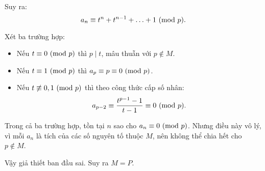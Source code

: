 \documentclass[../09-contruction-methods.tex]{subfiles}
\begin{document}
\begin{soln}
    Suy ra:
    \[
    	a_n \equiv t^n + t^{n-1} + \ldots + 1 \ (\mathrm{mod}\ p).
    \]
    
    Xét ba trường hợp:
    \begin{itemize}[topsep=0pt, partopsep=0pt, itemsep=0pt]
        \item Nếu \( t \equiv 0 \ (\mathrm{mod}\ p) \) thì \( p \mid t \), mâu thuẫn với \( p \notin M \).
        \item Nếu \( t \equiv 1 \ (\mathrm{mod}\ p) \) thì \( a_p \equiv p \equiv 0 \ (\mathrm{mod}\ p) \).
        \item Nếu \( t \not\equiv 0,1 \ (\mathrm{mod}\ p) \) thì theo công thức cấp số nhân:
        \[
        	a_{p-2} \equiv \frac{t^{p-1} - 1}{t - 1} \equiv 0 \ (\mathrm{mod}\ p).
        \]
    \end{itemize}
    
    Trong cả ba trường hợp, tồn tại \( n \) sao cho \( a_n \equiv 0 \ (\mathrm{mod}\ p) \).
	Nhưng điều này vô lý, vì mỗi \( a_n \) là tích của các số nguyên tố thuộc \( M \), nên không thể chia hết cho \( p \notin M \).
    
    Vậy giả thiết ban đầu sai. Suy ra \( M = P \).
\end{soln}

\end{document}
